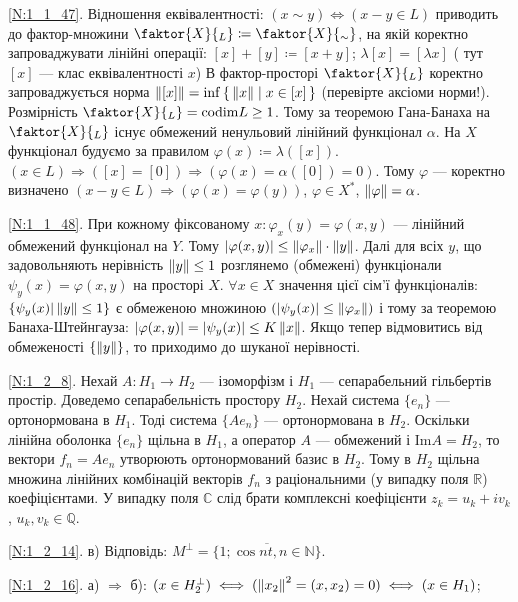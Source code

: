 \noindent\ref{N:1_1_47}. Відношення еквівалентності: $(x \sim y) \Leftrightarrow (x - y \in L)$
приводить до фактор-множини $\faktor{X}{_L} \coloneqq \faktor{X}{_\sim}$, на якій коректно запроваджувати
лінійні операції: $[x] + [y] \coloneqq [x+y]$; $\lambda [x] = [\lambda x]$ ( тут $[x]$ --- клас еквівалентності $x$)
В фактор-просторі $\faktor{X}{_L}$ коректно запроваджується норма $\left\lVert[x]\right\rVert = \inf\set{\left\lVert x\right\rVert \mid x \in [x]}$
(перевірте аксіоми норми!). Розмірність $\faktor{X}{_L} = \mathrm{codim} L \geq 1$. Тому за теоремою
Гана-Банаха на $\faktor{X}{_L}$ існує обмежений ненульовий лінійний функціонал $\alpha$.
На $X$ функціонал будуємо за правилом $\varphi(x) \coloneqq \lambda([x])$.
$(x \in L) \Rightarrow ([x] = [0]) \Rightarrow (\varphi(x) = \alpha([0]) = 0)$.
Тому $\varphi$ --- коректно визначено $(x-y \in L) \Rightarrow (\varphi(x) = \varphi(y))$,
$\varphi \in X^*$, $\left\lVert\varphi\right\rVert = \alpha$.

\noindent\ref{N:1_1_48}. При кожному фіксованому $x: \varphi_x(y) = \varphi(x, y)$ --- лінійний обмежений функціонал на $Y$. Тому
$|\varphi(x, y)| \leq \left\lVert\varphi_x\right\rVert \cdot \left\lVert y\right\rVert$. Далі для всіх $y$, що задовольняють нерівність $\left\lVert y\right\rVert \leq 1$
розглянемо (обмежені) функціонали $\psi_y (x) = \varphi(x, y)$ на просторі $X$. $\forall x \in X$ значення цієї
сім'ї функціоналів: $\{\psi_y (x) | \left\lVert y\right\rVert \leq 1\}$ є обмеженою множиною $(|\psi_y(x)| \leq \left\lVert\varphi_x\right\rVert)$ і тому за теоремою
Банаха-Штейнгауза: $|\varphi(x, y)| = |\psi_y(x)| \leq K\left\lVert x\right\rVert$. Якщо тепер відмовитись від обмеженості $\{\left\lVert y\right\rVert\}$, то приходимо до
шуканої нерівності.

\noindent\ref{N:1_2_8}. Нехай $A: H_1 \to H_2$ --- ізоморфізм і $H_1$ --- сепарабельний
гільбертів простір. Доведемо сепарабельність простору $H_2$. Нехай система $\{e_n\}$ ---
ортонормована в $H_1$. Тоді система $\{A e_n\}$ --- ортонормована в $H_2$. Оскільки
лінійна оболонка $\{e_n\}$ щільна в $H_1$, а оператор $A$ --- обмежений і $\mathrm{Im}A = H_2$,
то вектори $f_n = A e_n$ утворюють ортонормований базис в $H_2$. Тому в $H_2$ щільна
множина лінійних комбінацій векторів $f_n$ з раціональними (у випадку поля $\mathbb{R}$)
коефіцієнтами. У випадку поля $\mathbb{C}$ слід брати комплексні коефіцієнти
$z_k = u_k + i v_k$, $u_k, v_k \in \mathbb{Q}$.

\noindent\ref{N:1_2_14}. в) Відповідь: $M^{\perp} = \overline{\{1; \cos nt, n \in \mathbb{N} \}}$.

\noindent\ref{N:1_2_16}. а) $\Rightarrow$ б): 
$(x \in H_2^{\perp}) \iff (\left\lVert x_2\right\rVert^2 = (x, x_2) = 0) \iff (x \in H_1)$;

